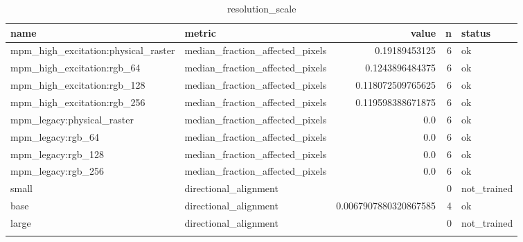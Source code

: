 \begin{table}
\centering
\begin{tabular}{llrrl}
name & metric & value & n & status \\
\hline
mpm\_high\_excitation:physical\_raster & median\_fraction\_affected\_pixels & 0.19189453125 & 6 & ok \\
mpm\_high\_excitation:rgb\_64 & median\_fraction\_affected\_pixels & 0.1243896484375 & 6 & ok \\
mpm\_high\_excitation:rgb\_128 & median\_fraction\_affected\_pixels & 0.118072509765625 & 6 & ok \\
mpm\_high\_excitation:rgb\_256 & median\_fraction\_affected\_pixels & 0.119598388671875 & 6 & ok \\
mpm\_legacy:physical\_raster & median\_fraction\_affected\_pixels & 0.0 & 6 & ok \\
mpm\_legacy:rgb\_64 & median\_fraction\_affected\_pixels & 0.0 & 6 & ok \\
mpm\_legacy:rgb\_128 & median\_fraction\_affected\_pixels & 0.0 & 6 & ok \\
mpm\_legacy:rgb\_256 & median\_fraction\_affected\_pixels & 0.0 & 6 & ok \\
small & directional\_alignment &  & 0 & not\_trained \\
base & directional\_alignment & 0.0067907880320867585 & 4 & ok \\
large & directional\_alignment &  & 0 & not\_trained \\
\caption{resolution\_scale}
\end{tabular}
\end{table}
